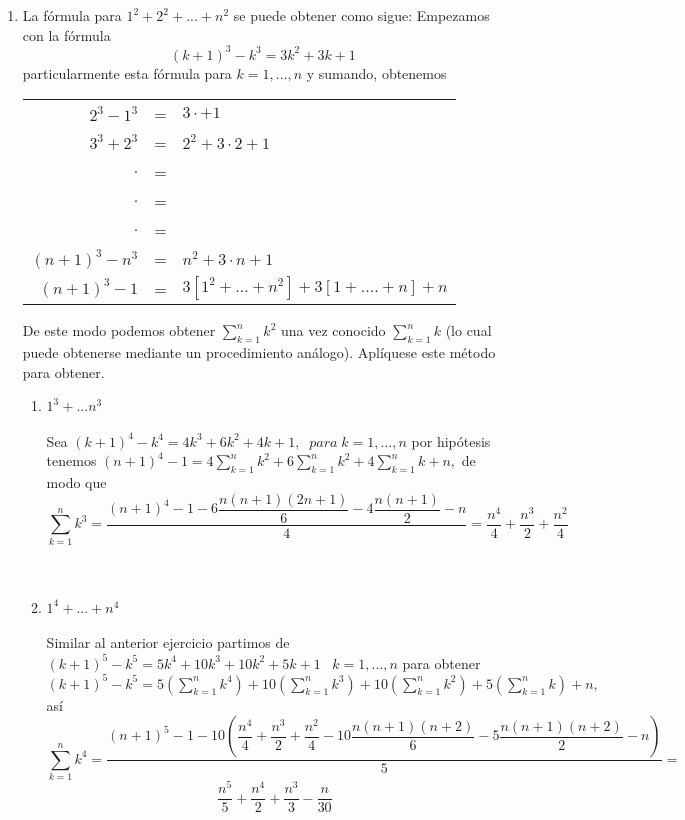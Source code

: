 \begin{enumerate}
\item 
La fórmula para $1^2 + 2^2 + ... + n^2$ se puede obtener como sigue: Empezamos con la fórmula $$(k+1)^3 - k^3 = 3k^2 + 3k +1$$
particularmente esta fórmula para $k=1,...,n$ \; y sumando, obtenemos \begin{center}
\begin{tabular}{r c l}
$2^3 - 1^3$&=&$3\cdot +1$\\
$3^3 + 2^3$&=&$2^2 + 3\cdot 2 +1 $\\
$.$&=&\\
$.$&=&\\
$.$&=&\\
$(n+1)^3 - n^3$&=&$n^2 + 3 \cdot n + 1$\\
\hline
$(n+1)^3 - 1$&=&$3 \left[ 1^2 + ... + n^2 \right] + 3 \left[ 1 + .... + n \right] + n$\\
\end{tabular}
\end{center}
De este modo podemos obtener $\displaystyle\sum_{k=1}^n k^2$ una vez conocido $\displaystyle\sum_{k=1}^n k $ (lo cual puede obtenerse mediante un procedimiento análogo). Aplíquese este método para obtener.
\begin{enumerate}[\bfseries (i)]
\item $1^3 + ... n^3$\\\\
Sea $(k+1)^4 - k^4 = 4k^3 + 6k^2 +4k + 1, \; \; para \; k=1,...,n $ por hipótesis tenemos $(n+1)^4 - 1 = 4 \displaystyle\sum_{k=1}^n k^2 + 6 \sum_{k=1}^n k^2 + 4 \sum_{k=1}^n k + n,$ de modo que $$\displaystyle\sum_{k=1}^n k^3 = \dfrac{ (n+1)^4 -1 - 6 \dfrac{n(n+1)(2n+1)}{6} - 4 \dfrac{n(n+1)}{2} - n}{4} = \dfrac{n^4}{4} + \dfrac{n^3}{2} + \dfrac{n^2}{4}$$\\\\

\item $1^4 + ... + n^4$\\\\
Similar al anterior ejercicio partimos de $(k+1)^5 - k^5 = 5k^4 + 10k^3 + 10k^2 + 5k + 1 \; \; \; k=1,...,n$ para obtener $(k+1)^5 - k^5 = 5 \left( \displaystyle\sum_{k=1}^n k^4 \right) + 10 \left( \sum_{k=1}^n k^3 \right) + 10 \left( \sum_{k=1}^n k^2 \right) + 5 \left( \sum_{k=1}^n k \right) + n,$ así $$\displaystyle\sum_{k=1}^n k^4 = \dfrac{(n+1)^5 - 1 - 10\left( \dfrac{n^4}{4} + \dfrac{n^3}{2} + \dfrac{n^2}{4} - 10 \dfrac{n(n+1)(n+2)}{6} - 5 \dfrac{n(n+1)(n+2)}{2} -n \right)}{5} = $$ $$\dfrac{n^5}{5} + \dfrac{n^4}{2} + \dfrac{n^3}{3} - \dfrac{n}{30}$$\\\\


\end{enumerate}
\end{enumerate}
